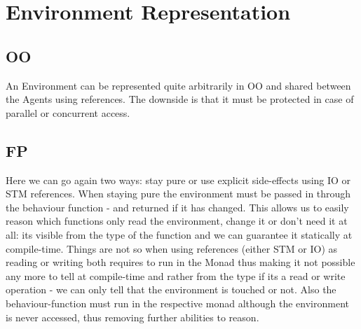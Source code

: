 \chapter{Environment Representation}

\section{OO}
An Environment can be represented quite arbitrarily in OO and shared between the Agents using references. The downside is that it must be protected in case of parallel or concurrent access.

\section{FP}
Here we can go again two ways: stay pure or use explicit side-effects using IO or STM references. When staying pure the environment must be passed in through the behaviour function - and returned if it has changed. This allows us to easily reason which functions only read the environment, change it or don't need it at all: its visible from the type of the function and we can guarantee it statically at compile-time.
Things are not so when using references (either STM or IO) as reading or writing both requires to run in the Monad thus making it not possible any more to tell at compile-time and rather from the type if its a read or write operation - we can only tell that the environment is touched or not. Also the behaviour-function must run in the respective monad although the environment is never accessed, thus removing further abilities to reason.
